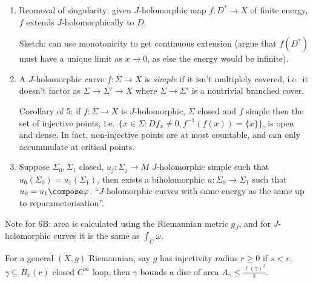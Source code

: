 \documentclass[a4paper]{article}
\begin{document}
\begin{enumerate}
\begin{itemize}
\begin{proof}
      \begin{proof}[Proof of second claim]
        \(u(\p D)\) bounds a 2-complex \(C\) which can be made arbitrarily close to a union of ``flat 2-simplicies'' (pieces of linear subplanes). These can be approximated by union of small flat discs. For a disc of radius \(\varepsilon\), \(\pi \varepsilon^2 = \frac{(2\pi \varepsilon)^2}{4\pi}\) so \(\mathrm{area} C \leq \frac{\ell(\p D)^2}{\pi}\). By Stokes'
        \[
          \mathrm{area}(u(D)) = \int_D f^*\omega = \int_C \omega \leq \int_C 1 = \mathrm{area}(C)
        \]
        because \(\norm \omega_p \leq 1\) for any \(p \in B^{2n}(0)\).
      \end{proof}
    \end{proof}
  \end{itemize}
\item Reomoval of singularity: given \(J\)-holomorphic map \(f: D^* \to X\) of finite energy, \(f\) extends \(J\)-holomorphically to \(D\).

  Sketch: can use monotonicity to get continuous extension (argue that \(f(D^*)\) must have a unique limit as \(x \to 0\), as else the energy would be infinite).
\item
  \begin{definition}
    A \(J\)-holomorphic curve \(f: \Sigma \to X\) is \emph{simple} if it isn't multiplely covered, i.e.\ it doesn't factor as \(\Sigma \to \Sigma' \to X\) where \(\Sigma \to \Sigma'\) is a nontrivial branched cover.
  \end{definition}

  Corollary of 5: if \(f: \Sigma \to X\) is \(J\)-holomorphic, \(\Sigma\) closed and \(f\) simple then the set of injective points, i.e.\ \(\{x \in \Sigma: Df_x \ne 0, f^{-1}(f(x)) = \{x\}\}\), is open and dense. In fact, non-injective points are at most countable, and can only accummulate at critical points.
\item Suppose \(\Sigma_0, \Sigma_1\) closed, \(u_j: \Sigma_j \to M\) \(J\)-holomorphic simple such that \(u_0(\Sigma_0) = u_1(\Sigma_1)\), then exists a biholomorphic \(u: \Sigma_0 \to \Sigma_1\) such that \(u_0 = u_1 \compose \varphi\). ``\(J\)-holomorphic curves with same energy as the same up to reparameterisation''.
\end{enumerate}

Note for 6B: area is calculated using the Riemannian metric \(g_J\), and for \(J\)-holomorphic curves it is the same as \(\int_C \omega\).

For a general \((X, g)\) Riemannian, say \(g\) has injectivity radius \(r \geq 0\) if \(s < r\), \(\gamma \subseteq B_x(r)\) closed \(C^\infty\) loop, then \(\gamma\) bounds a disc of area \(A_\gamma \leq \frac{\ell(\gamma)^2}{\pi}\).
\end{document}
